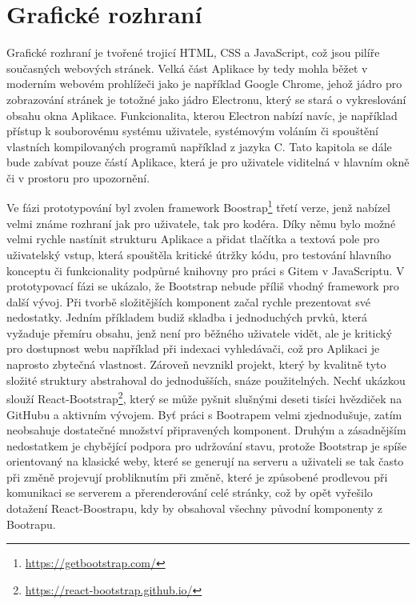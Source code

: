 \chapter{Grafické rozhraní}

Grafické rozhraní je tvořené trojicí HTML, CSS a JavaScript, což jsou pilíře současných webových stránek. Velká část Aplikace by tedy mohla běžet v moderním webovém prohlížeči jako je například Google Chrome, jehož jádro pro zobrazování stránek je totožné jako jádro Electronu, který se stará o vykreslování obsahu okna Aplikace. Funkcionalita, kterou Electron nabízí navíc, je například přístup k souborovému systému uživatele, systémovým voláním či spouštění vlastních kompilovaných programů například z jazyka C. Tato kapitola se dále bude zabívat pouze částí Aplikace, která je pro uživatele viditelná v hlavním okně či v prostoru pro upozornění.

Ve fázi prototypování byl zvolen framework Boostrap\footnote{\url{https://getbootstrap.com/}} třetí verze, jenž nabízel velmi známe rozhraní jak pro uživatele, tak pro kodéra. Díky němu bylo možné velmi rychle nastínit strukturu Aplikace a přidat tlačítka a textová pole pro uživatelský vstup, která spouštěla kritické útržky kódu, pro testování hlavního konceptu či funkcionality podpůrné knihovny pro práci s Gitem v JavaScriptu. V prototypovací fázi se ukázalo, že Bootstrap nebude příliš vhodný framework pro další vývoj. Při tvorbě složitějších komponent začal rychle prezentovat své nedostatky. Jedním příkladem budiž skladba i jednoduchých prvků, která vyžaduje přemíru obsahu, jenž není pro běžného uživatele vidět, ale je kritický pro dostupnost webu například při indexaci vyhledávači, což pro Aplikaci je naprosto zbytečná vlastnost. Zároveň nevznikl projekt, který by kvalitně tyto složité struktury abstrahoval do jednodušších, snáze použitelných. Nechť ukázkou slouží React-Bootstrap\footnote{\url{https://react-bootstrap.github.io/}}, který se může pyšnit slušnými deseti tisíci hvězdiček na GitHubu a aktivním vývojem. Byť práci s Bootrapem velmi zjednodušuje, zatím neobsahuje dostatečné množství připravených komponent. Druhým a zásadnějším nedostatkem je chybějící podpora pro udržování stavu, protože Bootstrap je spíše orientovaný na klasické weby, které se generují na serveru a uživateli se tak často při změně projevují probliknutím při změně, které je způsobené prodlevou při komunikaci se serverem a přerenderování celé stránky, což by opět vyřešilo dotažení React-Boostrapu, kdy by obsahoval všechny původní komponenty z Bootrapu.

